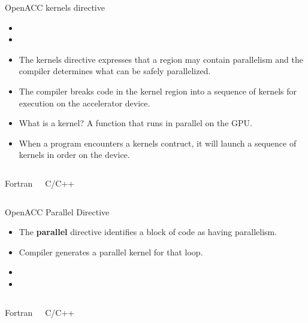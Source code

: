 \documentclass[10pt,t]{beamer}
\begin{document}
\begin{frame}[fragile,c]{OpenACC kernels directive}
  \begin{itemize}
  \item[C:] 
  \item[Fortran] 
  \item The kernels directive expresses that a region may contain parallelism and the compiler determines what can be safely parallelized.
  \item The compiler breaks code in the kernel region into a sequence of kernels for execution on the accelerator device.
  \item {\color{red}What is a kernel?} {\color{DarkGreen}A function that runs in parallel on the GPU.}
  \item When a program encounters a kernels contruct, it will launch a sequence of kernels in order on the device.
  \end{itemize}
  \vspace{-0.5cm}
  \begin{columns}
    \begin{exampleblock}{Fortran}
      
    \end{exampleblock}
    \begin{exampleblock}{C/C++}
      
    \end{exampleblock}
  \end{columns}
\end{frame}

\begin{frame}[fragile,c]{OpenACC Parallel Directive}
  \begin{itemize}
  \item The {\bf parallel} directive identifies a block of code as having parallelism.
  \item Compiler generates a parallel kernel for that loop.
  \item[C:] 
  \item[Fortran:] 
  \end{itemize}
  \vspace{-0.5cm}
  \begin{columns}
    \begin{exampleblock}{Fortran}
      
    \end{exampleblock}
    \begin{exampleblock}{C/C++}
      
    \end{exampleblock}
  \end{columns}
\end{frame}
\end{document}
